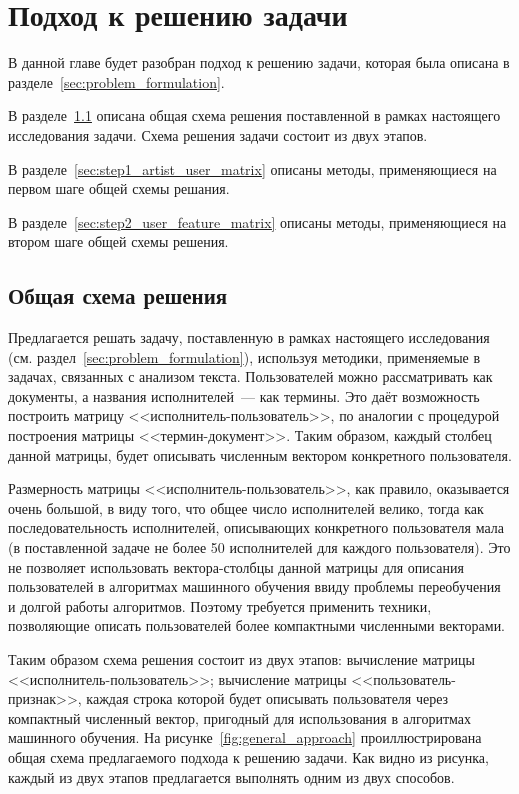 \chapter{Подход к решению задачи}
\label{ch:problem_solving}

В данной главе будет разобран подход к решению задачи,
которая была описана в разделе~\ref{sec:problem_formulation}.

В разделе~\ref{sec:general_approach} описана общая схема
решения поставленной в рамках настоящего исследования задачи.
Схема решения задачи состоит из двух этапов.

В разделе~\ref{sec:step1_artist_user_matrix} описаны методы,
применяющиеся на первом шаге общей схемы решания.

В разделе~\ref{sec:step2_user_feature_matrix} описаны методы,
применяющиеся на втором шаге общей схемы решения.

\section{Общая схема решения}
\label{sec:general_approach}

Предлагается решать задачу, поставленную в рамках настоящего
исследования (см. раздел~\ref{sec:problem_formulation}),
используя методики, применяемые в задачах, связанных с анализом
текста. Пользователей можно рассматривать как документы, а
названия исполнителей~--- как термины. Это даёт возможность
построить матрицу <<исполнитель-пользователь>>, по аналогии
с процедурой построения матрицы <<термин-документ>>. Таким
образом, каждый столбец данной матрицы, будет описывать
численным вектором конкретного пользователя.

Размерность матрицы <<исполнитель-пользователь>>, как
правило, оказывается очень большой, в виду того, что
общее число исполнителей велико, тогда как последовательность
исполнителей, описывающих конкретного пользователя мала
(в поставленной задаче не более 50 исполнителей для каждого
пользователя). Это не позволяет использовать вектора-столбцы
данной матрицы для описания пользователей в алгоритмах
машинного обучения ввиду проблемы переобучения и долгой
работы алгоритмов. Поэтому требуется применить техники,
позволяющие описать пользователей более компактными
численными векторами.

Таким образом схема решения состоит из двух этапов:
вычисление матрицы <<исполнитель-пользователь>>; вычисление
матрицы <<пользователь-признак>>, каждая строка которой
будет описывать пользователя через компактный численный вектор,
пригодный для использования в алгоритмах машинного обучения.
На рисунке~\ref{fig:general_approach} проиллюстрирована
общая схема предлагаемого подхода к решению задачи. Как видно
из рисунка, каждый из двух этапов предлагается
выполнять одним из двух способов.

